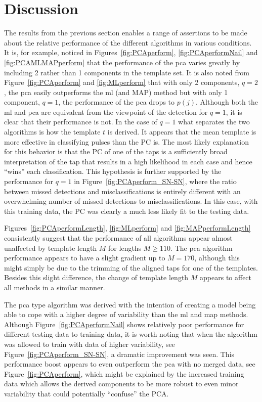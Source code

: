 \section{Discussion}

The results from the previous section enables a range of assertions to be made about the relative performance of the different algorithms in various conditions. It is, for example, noticed in Figures~\ref{fig:PCAperform}, \ref{fig:PCAperformNail} and \ref{fig:PCAMLMAPperform} that the performance of the \gls{pca} varies greatly by including 2 rather than 1 components in the template set. It is also noted from Figure~\ref{fig:PCAperform} and \ref{fig:MLperform} that with only 2 components, $q=2$, the \gls{pca} easily outperforms the \gls{ml} (and MAP) method but with only 1 component, $q=1$, the performance of the \gls{pca} drops to $p(j)$. Although both the \gls{ml} and \gls{pca} are equivalent from the viewpoint of the detection for $q=1$, it is clear that their performance is not. In the case of $q=1$ what separates the two algorithms is how the template $t$ is derived. It appears that the mean template is more effective in classifying pulses than the PC is. The most likely explanation for this behavior is that the PC of one of the taps is a sufficiently broad interpretation of the tap that results in a high likelihood in each case and hence ``wins'' each classification. This hypothesis is further supported by the performance for $q=1$ in Figure~\ref{fig:PCAperform_SN-SN}, where the ratio between missed detections and misclassifications is entirely different with an overwhelming number of missed detections to misclassifications. In this case, with this training data, the PC was clearly a much less likely fit to the testing data.

Figures~\ref{fig:PCAperformLength}, \ref{fig:MLperform} and \ref{fig:MAPperformLength} consistently suggest that the performance of all algorithms appear almost unaffected by template length $M$ for lengths $M\geq110$. The \gls{pca} algorithm performance appears to have a slight gradient up to $M=170$, although this might simply be due to the trimming of the aligned taps for one of the templates. Besides this slight difference, the change of template length $M$ appears to affect all methods in a similar manner.

The \gls{pca} type algorithm was derived with the intention of creating a model being able to cope with a higher degree of variability than the \gls{ml} and \gls{map} methods. Although Figure~\ref{fig:PCAperformNail} shows relatively poor performance for different testing data to training data, it is worth noting that when the algorithm was allowed to train with data of higher variability, see Figure~\ref{fig:PCAperform_SN-SN}, a dramatic improvement was seen. This performance boost appears to even outperform the \gls{pca} with no merged data, see Figure~\ref{fig:PCAperform}, which might be explained by the increased training data which allows the derived components to be more robust to even minor variability that could potentially ``confuse'' the PCA.

